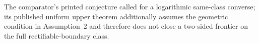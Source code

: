 The comparator's printed conjecture called for a logarithmic same-class converse; its published uniform upper theorem additionally assumes the geometric condition in Assumption~2 and therefore does not close a two-sided frontier on the full rectifiable-boundary class.